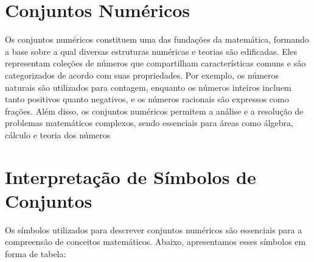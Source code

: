 \documentclass[a4paper,12pt]{article}  %
\begin{document}
\section{Conjuntos Numéricos}

Os conjuntos numéricos constituem uma das fundações da matemática, formando a base sobre a qual diversas estruturas numéricas e teorias são edificadas. Eles representam coleções de números que compartilham características comuns e são categorizados de acordo com suas propriedades. Por exemplo, os números naturais são utilizados para contagem, enquanto os números inteiros incluem tanto positivos quanto negativos, e os números racionais são expressos como frações. Além disso, os conjuntos numéricos permitem a análise e a resolução de problemas matemáticos complexos, sendo essenciais para áreas como álgebra, cálculo e teoria dos números

\section{Interpretação de Símbolos de Conjuntos}

Os símbolos utilizados para descrever conjuntos numéricos são essenciais para a compreensão de conceitos matemáticos. Abaixo, apresentamos esses símbolos em forma de tabela:
\end{document}
